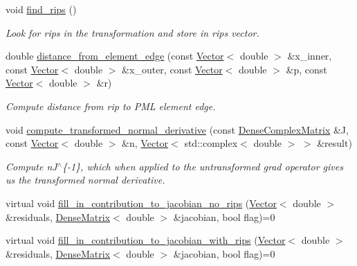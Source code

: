 \begin{DoxyCompactItemize}
\item 
void \hyperlink{classoomph_1_1TangentiallyDiscontinuousConformal2DPMLElement_a91cfa85707803db13028425ccd876638}{find\+\_\+rips} ()
\begin{DoxyCompactList}\small\item\em Look for rips in the transformation and store in rips vector. \end{DoxyCompactList}\item 
double \hyperlink{classoomph_1_1TangentiallyDiscontinuousConformal2DPMLElement_a9a2bcca5fb44204c9bc7cb7b2312a4de}{distance\+\_\+from\+\_\+element\+\_\+edge} (const \hyperlink{classoomph_1_1Vector}{Vector}$<$ double $>$ \&x\+\_\+inner, const \hyperlink{classoomph_1_1Vector}{Vector}$<$ double $>$ \&x\+\_\+outer, const \hyperlink{classoomph_1_1Vector}{Vector}$<$ double $>$ \&p, const \hyperlink{classoomph_1_1Vector}{Vector}$<$ double $>$ \&r)
\begin{DoxyCompactList}\small\item\em Compute distance from rip to P\+ML element edge. \end{DoxyCompactList}\item 
void \hyperlink{classoomph_1_1TangentiallyDiscontinuousConformal2DPMLElement_a273b4f1a24d0d60374e01b5dc668e272}{compute\+\_\+transformed\+\_\+normal\+\_\+derivative} (const \hyperlink{classoomph_1_1DenseComplexMatrix}{Dense\+Complex\+Matrix} \&J, const \hyperlink{classoomph_1_1Vector}{Vector}$<$ double $>$ \&n, \hyperlink{classoomph_1_1Vector}{Vector}$<$ std\+::complex$<$ double $>$ $>$ \&result)
\begin{DoxyCompactList}\small\item\em Compute n\textquotesingle{}J$^\wedge$\{-\/1\}, which when applied to the untransformed grad operator gives us the transformed normal derivative. \end{DoxyCompactList}\item 
virtual void \hyperlink{classoomph_1_1TangentiallyDiscontinuousConformal2DPMLElement_abacdee81b2f5c6194570068cf97e71f0}{fill\+\_\+in\+\_\+contribution\+\_\+to\+\_\+jacobian\+\_\+no\+\_\+rips} (\hyperlink{classoomph_1_1Vector}{Vector}$<$ double $>$ \&residuals, \hyperlink{classoomph_1_1DenseMatrix}{Dense\+Matrix}$<$ double $>$ \&jacobian, bool flag)=0
\item 
virtual void \hyperlink{classoomph_1_1TangentiallyDiscontinuousConformal2DPMLElement_a10c553cfd2310a23e4e5616f6ffb2c90}{fill\+\_\+in\+\_\+contribution\+\_\+to\+\_\+jacobian\+\_\+with\+\_\+rips} (\hyperlink{classoomph_1_1Vector}{Vector}$<$ double $>$ \&residuals, \hyperlink{classoomph_1_1DenseMatrix}{Dense\+Matrix}$<$ double $>$ \&jacobian, bool flag)=0

\end{DoxyCompactItemize}

